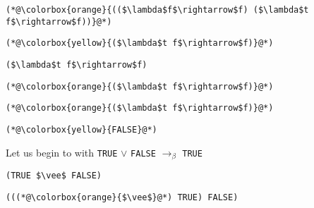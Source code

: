 \documentclass{beamer}
\begin{document}
\begin{frame}[fragile]{\CurrentSection}
\lstset{basicstyle=\ttfamily\small}\lstset{numbers=none}\lstset{language=ML}\begin{lstlisting}
(*@\colorbox{orange}{(($\lambda$f$\rightarrow$f) ($\lambda$t f$\rightarrow$f))}@*)
\end{lstlisting}
\pause\lstset{language=ML}\begin{lstlisting}
(*@\colorbox{yellow}{($\lambda$t f$\rightarrow$f)}@*)
\end{lstlisting}

\end{frame}

\begin{frame}[fragile]{\CurrentSection}
\lstset{basicstyle=\ttfamily\small}\lstset{numbers=none}\lstset{language=ML}\begin{lstlisting}
($\lambda$t f$\rightarrow$f)
\end{lstlisting}
\pause\lstset{language=ML}\begin{lstlisting}
(*@\colorbox{orange}{($\lambda$t f$\rightarrow$f)}@*)
\end{lstlisting}

\end{frame}

\begin{frame}[fragile]{\CurrentSection}
\lstset{basicstyle=\ttfamily\small}\lstset{numbers=none}\lstset{language=ML}\begin{lstlisting}
(*@\colorbox{orange}{($\lambda$t f$\rightarrow$f)}@*)
\end{lstlisting}
\pause\lstset{language=ML}\begin{lstlisting}
(*@\colorbox{yellow}{FALSE}@*)
\end{lstlisting}

\end{frame}

\begin{frame}[fragile]{\CurrentSection}
\begin{block}{\CurrentSubSection}
Let us begin to with \texttt{TRUE} $\vee$ \texttt{FALSE} $\rightarrow_\beta$ \texttt{TRUE}
\end{block}


\end{frame}

\begin{frame}[fragile]{\CurrentSection}
\lstset{basicstyle=\ttfamily\small}\lstset{numbers=none}\lstset{language=ML}\begin{lstlisting}
(TRUE $\vee$ FALSE)
\end{lstlisting}
\pause\lstset{language=ML}\begin{lstlisting}
(((*@\colorbox{orange}{$\vee$}@*) TRUE) FALSE)
\end{lstlisting}

\end{frame}
\end{document}
